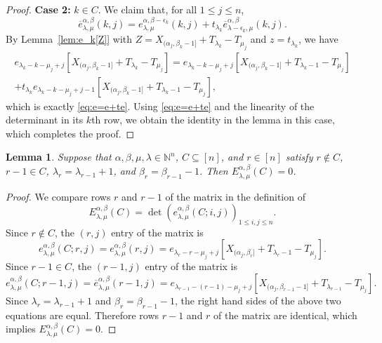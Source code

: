 \documentclass[12pt]{amsart}
\numberwithin{equation}{section}
\newtheorem{lem}[thm]{Lemma}
\theoremstyle{definition}
\newcommand\ove{\overline{e}}
\newcommand\NN{\mathbb{N}}
\begin{document}
\begin{proof}
\textbf{Case 2:} $k\in C$. We claim that, for all $1\le j\le n$,
\begin{equation}\label{eq:e=e+te}
  \ove_{\lambda,\mu}^{\alpha,\beta}(k,j)
  =e_{\lambda,\mu}^{\alpha,\beta-\epsilon_k}(k,j)
  +t_{\lambda_k} \ove_{\lambda-\epsilon_k,\mu}^{\alpha,\beta}(k,j).
\end{equation}
  By Lemma~\ref{lem:e_k[Z]} with
  $Z=X_{(\alpha_j,\beta_k-1]}+T_{\lambda_k}-T_{\mu_j}$ and $z=t_{\lambda_k}$,
  we have
  \begin{multline*}
    e_{\lambda_k-k-\mu_j+j}[X_{(\alpha_j,\beta_k-1]}+T_{\lambda_k}-T_{\mu_j}]
    = e_{\lambda_k-k-\mu_j+j}[X_{(\alpha_j,\beta_k-1]}+T_{\lambda_k-1}-T_{\mu_j}]
    \\ + t_{\lambda_k}
    e_{\lambda_k-k-\mu_j+j-1}[X_{(\alpha_j,\beta_k-1]}+T_{\lambda_k-1}-T_{\mu_j}],
  \end{multline*}
  which is exactly \eqref{eq:e=e+te}. Using \eqref{eq:e=e+te} and the linearity
  of the determinant in its $k$th row, we obtain the identity in the lemma in
  this case, which completes the proof.
\end{proof}

\begin{lem}\label{lem:equal rows}
  Suppose that $\alpha, \beta,\mu,\lambda \in \NN^n$, $C \subseteq [n]$, and
  $r \in [n]$ satisfy $r \notin C$, $r-1 \in C$, $\lambda_r = \lambda_{r-1}+1$,
  and $\beta_r = \beta_{r-1}-1$. Then $E_{\lambda, \mu}^{\alpha, \beta}(C) = 0$.
\end{lem}
\begin{proof}
We
  compare rows $r$ and $r-1$ of the matrix in the definition of
\[
  E_{\lambda, \mu}^{\alpha, \beta}(C) =
\det\left(e^{\alpha,\beta}_{\lambda,\mu} (C;i,j)\right)_{1\le i,j\le n}.
\]
Since $r\notin C$, the $(r,j)$ entry of the matrix is
\[
  e^{\alpha,\beta}_{\lambda,\mu}(C;r,j)
  =e^{\alpha,\beta}_{\lambda,\mu}(r,j)
    =e_{\lambda_r-r-\mu_j+j}[X_{(\alpha_j,\beta_r]}+T_{\lambda_r-1}-T_{\mu_j}].
\]
Since $r-1\in C$, the $(r-1,j)$ entry of the matrix is
\[
  e^{\alpha,\beta}_{\lambda,\mu}(C;r-1,j)
  =\ove^{\alpha,\beta}_{\lambda,\mu}(r-1,j)
    =e_{\lambda_{r-1}-(r-1)-\mu_j+j}[X_{(\alpha_j,\beta_{r-1}-1]}+T_{\lambda_{r-1}}-T_{\mu_j}].
\]
Since $\lambda_r = \lambda_{r-1}+1$ and $\beta_r = \beta_{r-1}-1$, the right
hand sides of the above two equations are equal. Therefore rows $r-1$ and $r$ of
the matrix are identical, which implies $E_{\lambda, \mu}^{\alpha, \beta}(C) =
0$.
\end{proof}
\end{document}
